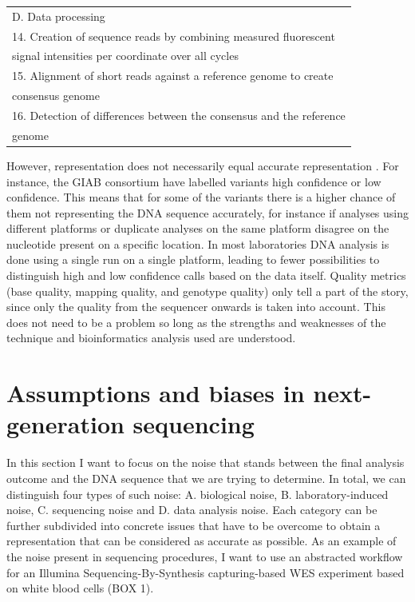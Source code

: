 \begin{table}[H]
\begin{minipage}{\textwidth}
\begin{tabular}{!{\color{deeporange}\VRule[3pt]}l!{\color{deeporange}\VRule[3pt]}}
			\\
			\setrow{\bfseries}D. Data processing \\
			14.	Creation of sequence reads by combining measured fluorescent \\ signal intensities per coordinate over all cycles \\
			15.	Alignment of short reads against a reference genome to create \\ consensus genome \\
			16.	Detection of differences between the consensus and the reference  \\ genome \\
			\hline
		\end{tabular}
	\end{minipage}
\end{table}

\noindent However, representation does not necessarily equal accurate representation \cite{Nguyen_2016}. 
For instance, the GIAB consortium have labelled variants high confidence or low confidence. 
This means that for some of the variants there is a higher chance of them not representing the DNA sequence accurately, for instance if analyses using different platforms or duplicate analyses on the same platform disagree on the nucleotide present on a specific location. 
In most laboratories DNA analysis is done using a single run on a single platform, leading to fewer possibilities to distinguish high and low confidence calls based on the data itself. 
Quality metrics (base quality, mapping quality, and genotype quality) only tell a part of the story, since only the quality from the sequencer onwards is taken into account. 
This does not need to be a problem so long as the strengths and weaknesses of the technique and bioinformatics analysis used are understood. 

\section[Assumptions and biases in next-generation sequencing]{Assumptions and biases in next-generation \newline sequencing} \label{Assumptions and biases in next-generation sequencing}
In this section I want to focus on the noise that stands between the final analysis outcome and the DNA sequence that we are trying to determine. 
In total, we can distinguish four types of such noise: A. biological noise, B. laboratory-induced noise, C. sequencing noise and D. data analysis noise. 
Each category can be further subdivided into concrete issues that have to be overcome to obtain a representation that can be considered as accurate as possible. 
As an example of the noise present in sequencing procedures, I want to use an abstracted workflow for an Illumina Sequencing-By-Synthesis capturing-based WES experiment based on white blood cells (BOX 1). 


